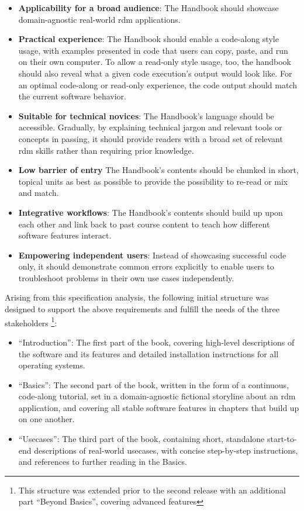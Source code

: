 \begin{itemize}
	\item \textbf{Applicability for a broad audience}: The Handbook should showcase domain-agnostic real-world \gls{rdm} applications.
	\item \textbf{Practical experience}: The Handbook should enable a code-along style usage, with examples presented in code that users can copy, paste, and run on their own computer. To allow a read-only style usage, too, the handbook should also reveal what a given code execution's output would look like. For an optimal code-along or read-only experience, the code output should match the current software behavior.
	\item \textbf{Suitable for technical novices}: The Handbook's language should be accessible. Gradually, by explaining technical jargon and relevant tools or concepts in passing, it should provide readers with a broad set of relevant \gls{rdm} skills rather than requiring prior knowledge.
	\item \textbf{Low barrier of entry} The Handbook's contents should be chunked in short, topical units as best as possible to provide the possibility to re-read or mix and match.
	\item \textbf{Integrative workflows}: The Handbook's contents should build up upon each other and link back to past course content to teach how different software features interact.
	\item \textbf{Empowering independent users}: Instead of showcasing successful code only, it should demonstrate common errors explicitly to enable users to troubleshoot problems in their own use cases independently.

\end{itemize}

Arising from this specification analysis, the following initial structure was designed to support the above requirements and fulfill the needs of the three stakeholders \citep{wagner_adina_s_2020_7906718}\footnote{This structure was extended prior to the second release with an additional part ``Beyond Basics'', covering advanced features}:

\begin{itemize}
	\item ``Introduction'': The first part of the book, covering high-level descriptions of the software and its features and detailed installation instructions for all operating systems.
	\item ``Basics'': The second part of the book, written in the form of a continuous, code-along tutorial, set in a domain-agnostic fictional storyline about an \gls{rdm} application, and covering all stable software features in chapters that build up on one another.
	\item ``Usecases'': The third part of the book, containing short, standalone start-to-end descriptions of real-world usecases, with concise step-by-step instructions, and references to further reading in the Basics.
\end{itemize}

